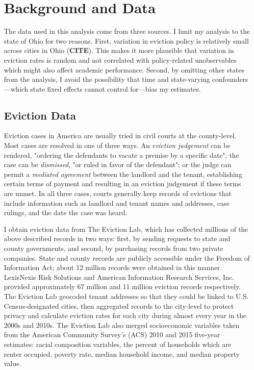 \documentclass[12pt]{article}
\begin{document}
\section{Background and Data} \label{sec:data}
The data used in this analysis come from three sources. I limit my analysis to the state of Ohio for two reasons. First, variation in eviction policy is relatively small across cities in Ohio (\textbf{CITE}). This makes it more plausible that variation in eviction rates is random and not correlated with policy-related unobservables which might also affect academic performance. Second, by omitting other states from the analysis, I avoid the possibility that time and state-varying confounders—which state fixed effects cannot control for—bias my estimates.
\subsection{Eviction Data}
Eviction cases in America are usually tried in civil courts at the county-level. Most cases are resolved in one of three ways. An \textit{eviction judgement} can be rendered, "ordering the defendants to vacate a premise by a specific date"; the case can be \textit{dismissed}, "or ruled in favor of the defendant"; or the judge can permit a \textit{mediated agreement} between the landlord and the tenant, establishing certain terms of payment and resulting in an eviction judgement if these terms are unmet\citep{desmond_eviction_2018}. In all three cases, courts generally keep records of evictions that include information such as landlord and tenant names and addresses, case rulings, and the date the case was heard.

I obtain eviction data from The Eviction Lab, which has collected millions of the above described records in two ways: first, by sending requests to state and county governments, and second, by purchasing records from two private companies. State and county records are publicly accessible under the Freedom of Information Act; about 12 million records were obtained in this manner. LexisNexis Risk Solutions and American Information Research Services, Inc. provided approximately 67 million and 11 million eviction records respectively. The Eviction Lab geocoded tenant addresses so that they could be linked to U.S. Census-designated cities, then aggregated records to the city-level to protect privacy and calculate eviction rates for each city during almost every year in the 2000s and 2010s. The Eviction Lab also merged socioeconomic variables taken from the American Community Survey's (ACS) 2010 and 2015 five-year estimates: racial composition variables, the percent of households which are renter occupied, poverty rate, median household income, and median property value.
\end{document}
